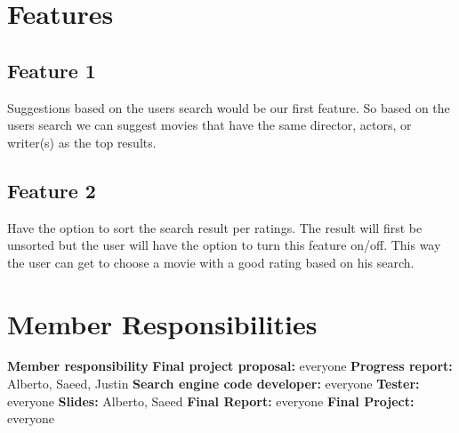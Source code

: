 \documentclass[11pt]{article}
\begin{document}
\section{Features}
\subsection{Feature 1}
Suggestions based on the users search would be our first feature. So based on the users search we can suggest movies that have the same director, actors, or writer(s) as the top results.

\subsection{Feature 2}
Have the option to sort the search result per ratings. The result will first be unsorted but the user will have the option to turn this feature on/off. This way the user can get to choose a movie with a good rating based on his search.

\section{Member Responsibilities}
\textbf{Member responsibility} \newline
\textbf{Final project proposal:} everyone \newline
\textbf{Progress report:} Alberto, Saeed, Justin \newline
\textbf{Search engine code developer:} everyone \newline
\textbf{Tester:} everyone \newline
\textbf{Slides:} Alberto, Saeed \newline
\textbf{Final Report:} everyone \newline
\textbf{Final Project:} everyone


%
%
\end{document}
